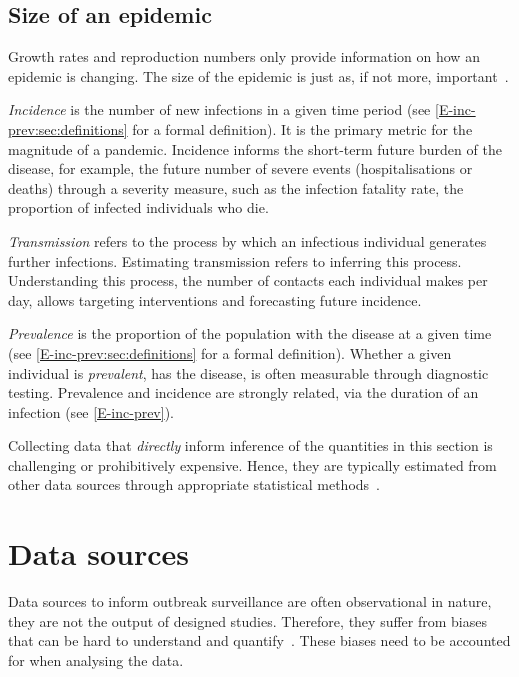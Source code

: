 \documentclass[thesis.tex]{subfiles}
\begin{document}
\subsection{Size of an epidemic}

Growth rates and reproduction numbers only provide information on how an epidemic is changing.
The size of the epidemic is just as, if not more, important~\autocite{pellisEstimation}.

\emph{Incidence} is the number of new infections in a given time period (see \cref{E-inc-prev:sec:definitions} for a formal definition).
It is the primary metric for the magnitude of a pandemic.
Incidence informs the short-term future burden of the disease, for example, the future number of severe events (hospitalisations or deaths) through a severity measure, such as the infection fatality rate, the proportion of infected individuals who die.

\emph{Transmission} refers to the process by which an infectious individual generates further infections.
Estimating transmission refers to inferring this process.
Understanding this process, \eg the number of contacts each individual makes per day, allows targeting interventions and forecasting future incidence.

\emph{Prevalence} is the proportion of the population with the disease at a given time (see \cref{E-inc-prev:sec:definitions} for a formal definition).
Whether a given individual is \emph{prevalent}, \ie has the disease, is often measurable through diagnostic testing.
Prevalence and incidence are strongly related, via the duration of an infection (see \cref{E-inc-prev}).


Collecting data that \emph{directly} inform inference of the quantities in this section is challenging or prohibitively expensive.
Hence, they are typically estimated from other data sources through appropriate statistical methods~\autocite{heldHandbook,oneillIntroduction}.

\section{Data sources}

Data sources to inform outbreak surveillance are often observational in nature, \ie they are not the output of designed studies.
Therefore, they suffer from biases that can be hard to understand and quantify~\autocite{shadboltChallenges}.
These biases need to be accounted for when analysing the data.
\end{document}
